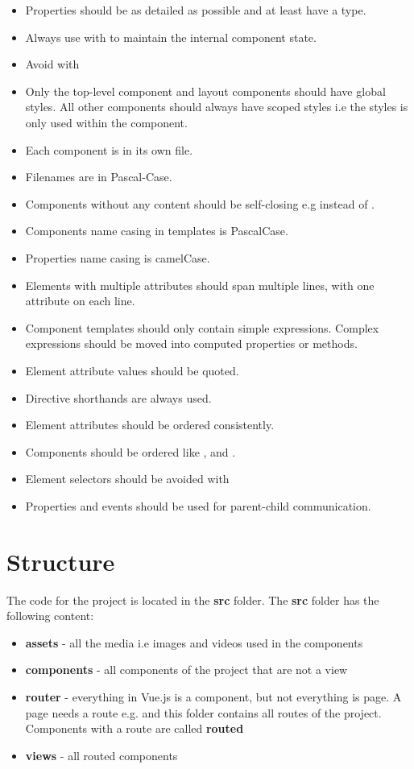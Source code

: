 \begin{itemize}
    \item Properties should be as detailed as possible and at least have a type.
    \item Always use  with  to maintain the internal component state.
    \item Avoid  with 
    \item Only the top-level  component and layout components should have global styles. All other components should always have scoped styles i.e the styles is only used within the component.
    \item Each component is in its own file.
    \item Filenames are in Pascal-Case.
    \item Components without any content should be self-closing e.g  instead of .
    \item Components name casing in templates is PascalCase.
    \item Properties name casing is camelCase.
    \item Elements with multiple attributes should span multiple lines, with one attribute on each line.
    \item Component templates should only contain simple expressions. Complex expressions should be moved into computed properties or methods.
    \item Element attribute values should be quoted.
    \item Directive shorthands are always used.
    \item Element attributes should be ordered consistently.
    \item Components should be ordered like ,  and .
    \item Element selectors should be avoided with 
    \item Properties and events should be used for parent-child communication.
\end{itemize}

\section{Structure}
\label{section:structure}
The code for the project is located in the \textbf{src} folder. The \textbf{src} folder has the following content: 

\begin{itemize}
    \item \textbf{assets} - all the media i.e images and videos used in the components
    \item \textbf{components} - all components of the project that are not a view
    \item \textbf{router} - everything in Vue.js is a component, but not everything is page. A page needs a route e.g.  and this folder contains all routes of the project. Components with a route are called \textbf{routed}
    \item \textbf{views} - all routed components
\end{itemize}

